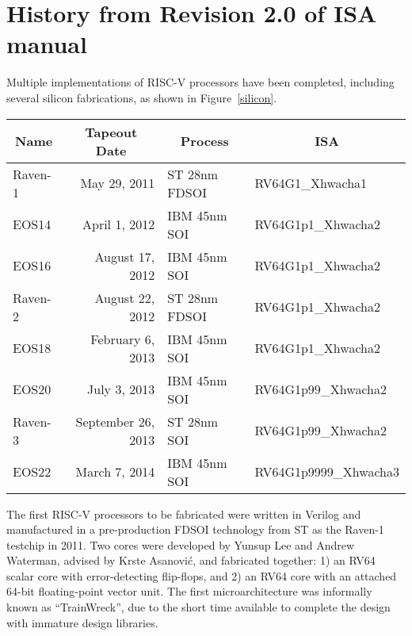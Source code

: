 \section{History from Revision 2.0 of ISA manual}

Multiple implementations of RISC-V processors have been completed,
including several silicon fabrications, as shown in
Figure~\ref{silicon}.

\begin{table*}[!h]
\begin{center}
\begin{tabular}{|l|r|l|l|}
\hline
\multicolumn{1}{|c|}{Name} & \multicolumn{1}{|c|}{Tapeout Date} & \multicolumn{1}{|c|}{Process} & \multicolumn{1}{|c|}{ISA} \\ \hline
\hline
Raven-1 & May 29, 2011 & ST 28nm FDSOI & RV64G1\_Xhwacha1 \\ \hline
EOS14 & April 1, 2012 & IBM 45nm SOI & RV64G1p1\_Xhwacha2 \\ \hline
EOS16 & August 17, 2012 & IBM 45nm SOI & RV64G1p1\_Xhwacha2 \\ \hline
Raven-2 & August 22, 2012 & ST 28nm FDSOI & RV64G1p1\_Xhwacha2 \\ \hline
EOS18 & February 6, 2013 & IBM 45nm SOI & RV64G1p1\_Xhwacha2 \\ \hline
EOS20 & July 3, 2013 & IBM 45nm SOI & RV64G1p99\_Xhwacha2 \\ \hline
Raven-3 & September 26, 2013 & ST 28nm SOI & RV64G1p99\_Xhwacha2 \\ \hline
EOS22 & March 7, 2014 & IBM 45nm SOI & RV64G1p9999\_Xhwacha3 \\ \hline
\end{tabular}
\end{center}
\vspace{-0.15in}
\caption{Fabricated RISC-V testchips.}
\label{silicon}
\end{table*}

The first RISC-V processors to be fabricated were written in Verilog and
manufactured in a pre-production  FDSOI technology from
ST as the Raven-1 testchip in 2011.  Two cores were developed by Yunsup
Lee and Andrew Waterman, advised by Krste Asanovi\'{c}, and fabricated
together: 1) an RV64 scalar core with error-detecting flip-flops, and 2)
an RV64 core with an attached 64-bit floating-point vector unit.  The
first microarchitecture was informally known as ``TrainWreck'', due to
the short time available to complete the design with immature design
libraries.

